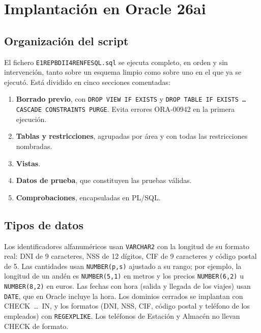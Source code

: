 \documentclass[11pt,a4paper]{article}
\DeclareRobustCommand{\_}{\textunderscore\allowbreak}
\newcommand{\tb}[1]{\texttt{#1}}
\begin{document}


\section{Implantación en Oracle 26ai}
\subsection{Organización del script}
El fichero \tb{E1\_REP\_BDII4\_RENFE\_SQL.sql} se ejecuta completo, en orden y sin intervención, tanto sobre un esquema limpio como sobre uno en el que ya se ejecutó. Está dividido en cinco secciones comentadas:
\begin{enumerate}
\item \textbf{Borrado previo}, con \tb{DROP VIEW IF EXISTS} y \tb{DROP TABLE IF EXISTS \dots{} CASCADE CONSTRAINTS PURGE}. Evita errores ORA-00942 en la primera ejecución.
\item \textbf{Tablas y restricciones}, agrupadas por área y con todas las restricciones nombradas.
\item \textbf{Vistas}.
\item \textbf{Datos de prueba}, que constituyen las pruebas válidas.
\item \textbf{Comprobaciones}, encapsuladas en PL/SQL.
\end{enumerate}

\subsection{Tipos de datos}
Los identificadores alfanuméricos usan \tb{VARCHAR2} con la longitud de su formato real: DNI de 9 caracteres, NSS de 12 dígitos, CIF de 9 caracteres y código postal de 5. Las cantidades usan \tb{NUMBER(p,s)} ajustado a su rango; por ejemplo, la longitud de un andén es \tb{NUMBER(5,1)} en metros y los precios \tb{NUMBER(6,2)} u \tb{NUMBER(8,2)} en euros. Las fechas con hora (salida y llegada de los viajes) usan \tb{DATE}, que en Oracle incluye la hora. Los dominios cerrados se implantan con CHECK~\dots~IN, y los formatos (DNI, NSS, CIF, código postal y teléfono de los empleados) con \tb{REGEXP\_LIKE}. Los teléfonos de Estación y Almacén no llevan CHECK de formato.
\end{document}

